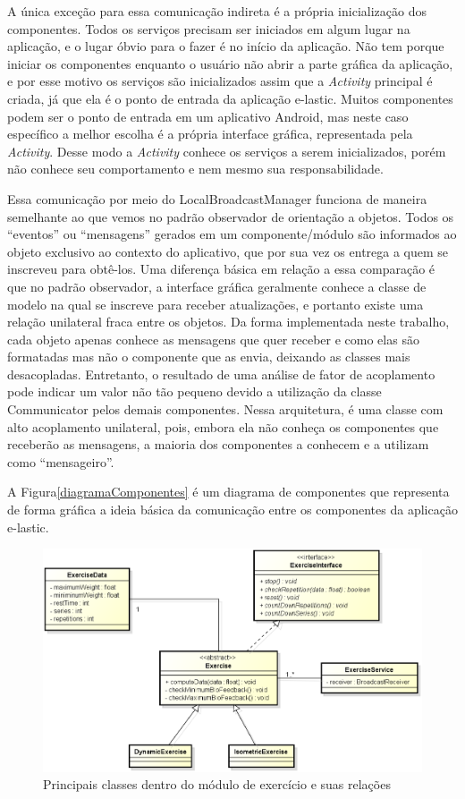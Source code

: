 A única exceção para essa comunicação indireta é a própria inicialização dos componentes. Todos os serviços precisam ser iniciados em algum lugar na aplicação, e o lugar óbvio para o fazer é no início da aplicação. Não tem porque iniciar os componentes enquanto o usuário não abrir a parte gráfica da aplicação, e por esse motivo os serviços são inicializados assim que a \textit{Activity} principal é criada, já que ela é o ponto de entrada da aplicação e-lastic. Muitos componentes podem ser o ponto de entrada em um aplicativo Android, mas neste caso específico a melhor escolha é a própria interface gráfica, representada pela \textit{Activity}. Desse modo a \textit{Activity} conhece os serviços a serem inicializados, porém não conhece seu comportamento e nem mesmo sua responsabilidade.

Essa comunicação por meio do LocalBroadcastManager funciona de maneira semelhante ao que vemos no padrão observador de orientação a objetos. Todos os ``eventos'' ou ``mensagens'' gerados em um componente/módulo são informados ao objeto exclusivo ao contexto do aplicativo, que por sua vez os entrega a quem se inscreveu para obtê-los. Uma diferença básica em relação a essa comparação é que no padrão observador, a interface gráfica geralmente conhece a classe de modelo na qual se inscreve para receber atualizações, e portanto existe uma relação unilateral fraca entre os objetos. Da forma implementada neste trabalho, cada objeto apenas conhece as mensagens que quer receber e como elas são formatadas mas não o componente que as envia, deixando as classes mais desacopladas. Entretanto, o resultado de uma análise de fator de acoplamento pode indicar um valor não tão pequeno devido a utilização da classe Communicator pelos demais componentes. Nessa arquitetura, é uma classe com alto acoplamento unilateral, pois, embora ela não conheça os componentes que receberão as mensagens, a maioria dos componentes a conhecem e a utilizam como ``mensageiro''. 

A Figura\ref{diagramaComponentes} é um diagrama de componentes que representa de forma gráfica a ideia básica da comunicação entre os componentes da aplicação e-lastic.

\begin{figure}[!htb]
\centering
\includegraphics [keepaspectratio=true,scale=0.60]{figuras/diagramaExercicios.eps}
\caption{Principais classes dentro do módulo de exercício e suas relações}
\label{diagramaExercicios}
\end{figure}

